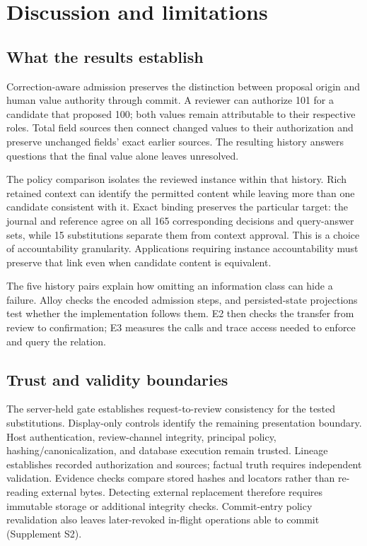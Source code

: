 \section{Discussion and limitations}
\label{sec:discussion}

\subsection{What the results establish}

Correction-aware admission preserves the distinction between proposal origin and human value authority through commit. A reviewer can authorize 101 for a candidate that proposed 100; both values remain attributable to their respective roles. Total field sources then connect changed values to their authorization and preserve unchanged fields' exact earlier sources. The resulting history answers questions that the final value alone leaves unresolved.

The policy comparison isolates the reviewed instance within that history. Rich retained context can identify the permitted content while leaving more than one candidate consistent with it. Exact binding preserves the particular target: the journal and reference agree on all 165 corresponding decisions and query-answer sets, while 15 substitutions separate them from context approval. This is a choice of accountability granularity. Applications requiring instance accountability must preserve that link even when candidate content is equivalent.

The five history pairs explain how omitting an information class can hide a failure. Alloy checks the encoded admission steps, and persisted-state projections test whether the implementation follows them. E2 then checks the transfer from review to confirmation; E3 measures the calls and trace access needed to enforce and query the relation.

\subsection{Trust and validity boundaries}

The server-held gate establishes request-to-review consistency for the tested substitutions. Display-only controls identify the remaining presentation boundary. Host authentication, review-channel integrity, principal policy, hashing/canonicalization, and database execution remain trusted. Lineage establishes recorded authorization and sources; factual truth requires independent validation. Evidence checks compare stored hashes and locators rather than re-reading external bytes. Detecting external replacement therefore requires immutable storage or additional integrity checks. Commit-entry policy revalidation also leaves later-revoked in-flight operations able to commit (Supplement S2).

